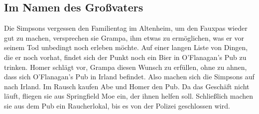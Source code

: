 
\subsection{Im Namen des Großvaters}
Die Simpsons vergessen den Familientag im Altenheim, um den Fauxpas wieder gut zu machen, versprechen sie Grampa, ihm etwas zu ermöglichen, was er vor seinem Tod unbedingt noch erleben möchte. Auf einer langen Liste von Dingen, die er noch vorhat, findet sich der Punkt \glqq noch ein Bier in O'Flanagan's Pub zu trinken\grqq . Homer schlägt vor, Grampa diesen Wunsch zu erfüllen, ohne zu ahnen, dass sich O'Flanagan's Pub in Irland befindet. Also machen sich die Simpsons auf nach Irland. Im Rausch kaufen Abe und Homer den Pub. Da das Geschäft nicht läuft, fliegen sie aus Springfield Moe ein, der ihnen helfen soll. Schließlich machen sie aus dem Pub ein Raucherlokal, bis es von der Polizei geschlossen wird.


